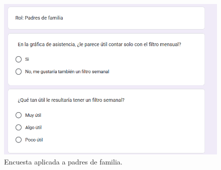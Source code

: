 \begin{figure}[H]
     \centering
    \begin{minipage}[b]{0.50\textwidth}
        \centering
        \includegraphics[width=1.0\textwidth]{./Media/p3.png}
        \caption{Encuesta aplicada a padres de familia.}
    \end{minipage}

\end{figure}


